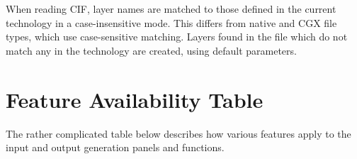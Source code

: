 When reading CIF, layer names are matched to those defined in the
current technology in a case-insensitive mode.  This differs from
native and CGX file types, which use case-sensitive matching.  Layers
found in the file which do not match any in the technology are
created, using default parameters.

\newpage
\section{Feature Availability Table}

\label{features}
The rather complicated table below describes how various features
apply to the input and output generation panels and functions.

